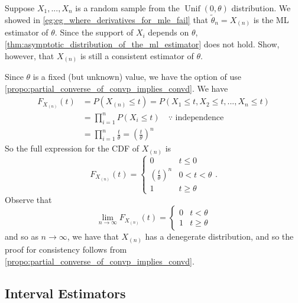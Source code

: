 \documentclass[notoc,notitlepage]{tufte-book}
\DeclareMathOperator{\Unif}{Unif }
\begin{document}
\begin{eg}
  Suppose $X_1, ..., X_n$ is a random sample from the $\Unif(0, \theta)$ distribution. We showed in \cref{eg:eg_where_derivatives_for_mle_fail} that $\tilde{\theta}_n = X_{(n)}$ is the ML estimator of $\theta$. Since the support of $X_i$ depends on $\theta$, \cref{thm:asymptotic_distribution_of_the_ml_estimator} does not hold. Show, however, that $X_{(n)}$ is still a consistent estimator of $\theta$.
\end{eg}

\begin{solution}
  Since $\theta$ is a fixed (but unknown) value, we have the option of use\\ \noindent \cref{propo:partial_converse_of_convp_implies_convd}. We have
  \begin{align*}
    F_{X_{(n)}}(t) &= P(X_{(n)} \leq t) = P(X_1 \leq t, X_2 \leq t, ..., X_n \leq t) \\
                   &= \prod_{i=1}^{n} P(X_i \leq t) \quad \because \text{ independence } \\
                   &= \prod_{i=1}^{n} \frac{t}{\theta} = \left( \frac{t}{\theta} \right)^n
  \end{align*}
  So the full expression for the CDF of $X_{(n)}$ is
  \begin{equation*}
    F_{X_{(n)}}(t) = \begin{cases}
      0 & t \leq 0 \\
      \left( \frac{t}{\theta} \right)^n & 0 < t < \theta \\
      1 & t \geq \theta
    \end{cases}.
  \end{equation*}
  Observe that
  \begin{equation*}
    \lim_{n \to \infty}F_{X_{(n)}}(t) = \begin{cases}
      0 & t < \theta \\
      1 & t \geq \theta
    \end{cases}
  \end{equation*}
  and so as $n \to \infty$, we have that $X_{(n)}$ has a denegerate distribution, and so the proof for consistency follows from \cref{propo:partial_converse_of_convp_implies_convd}.
\end{solution}


\subsection{Interval Estimators}%
\label{sub:interval_estimators}
\end{document}
